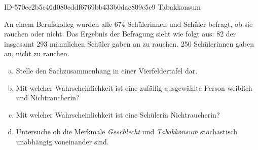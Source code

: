 \begin{exercise}
      {ID-570ec2b5c46d080cddf6769bb433b0dac809c5e9}
      {Tabakkonsum}
  \ifproblem\problem\par
    An einem Berufskolleg wurden alle \num{674}
    Schülerinnen und Schüler befragt, ob sie
    rauchen oder nicht. Das Ergebnis der
    Befragung sieht wie folgt aus:
    \num{82} der insgesamt \num{293} männlichen
    Schüler gaben an zu rauchen.
    \num{250} Schülerinnen gaben an, nicht zu
    rauchen.
    \begin{enumerate}[a)]
      \item Stelle den Sachzusammenhang in einer
            Vierfeldertafel dar.
      \item Mit welcher Wahrscheinlichkeit ist
            eine zufällig ausgewählte Person
            weiblich und Nichtraucherin?
      \item Mit welcher Wahrscheinlichkeit ist
            eine Schülerin Nichtraucherin?
      \item Untersuche ob die Merkmale
            \textit{Geschlecht} und
            \textit{Tabakkonsum} stochastisch
            unabhängig voneinander sind.
    \end{enumerate}
  \fi
\end{exercise}
